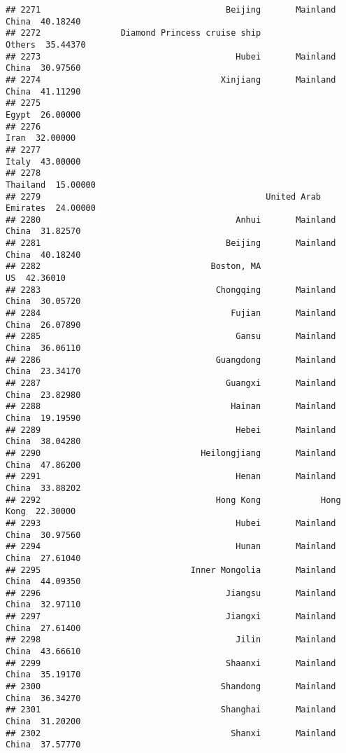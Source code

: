 \documentclass[
]{article}
\begin{document}
\begin{verbatim}
## 2271                                     Beijing       Mainland China  40.18240
## 2272                Diamond Princess cruise ship               Others  35.44370
## 2273                                       Hubei       Mainland China  30.97560
## 2274                                    Xinjiang       Mainland China  41.11290
## 2275                                                            Egypt  26.00000
## 2276                                                             Iran  32.00000
## 2277                                                            Italy  43.00000
## 2278                                                         Thailand  15.00000
## 2279                                             United Arab Emirates  24.00000
## 2280                                       Anhui       Mainland China  31.82570
## 2281                                     Beijing       Mainland China  40.18240
## 2282                                  Boston, MA                   US  42.36010
## 2283                                   Chongqing       Mainland China  30.05720
## 2284                                      Fujian       Mainland China  26.07890
## 2285                                       Gansu       Mainland China  36.06110
## 2286                                   Guangdong       Mainland China  23.34170
## 2287                                     Guangxi       Mainland China  23.82980
## 2288                                      Hainan       Mainland China  19.19590
## 2289                                       Hebei       Mainland China  38.04280
## 2290                                Heilongjiang       Mainland China  47.86200
## 2291                                       Henan       Mainland China  33.88202
## 2292                                   Hong Kong            Hong Kong  22.30000
## 2293                                       Hubei       Mainland China  30.97560
## 2294                                       Hunan       Mainland China  27.61040
## 2295                              Inner Mongolia       Mainland China  44.09350
## 2296                                     Jiangsu       Mainland China  32.97110
## 2297                                     Jiangxi       Mainland China  27.61400
## 2298                                       Jilin       Mainland China  43.66610
## 2299                                     Shaanxi       Mainland China  35.19170
## 2300                                    Shandong       Mainland China  36.34270
## 2301                                    Shanghai       Mainland China  31.20200
## 2302                                      Shanxi       Mainland China  37.57770

\end{verbatim}
\end{document}

